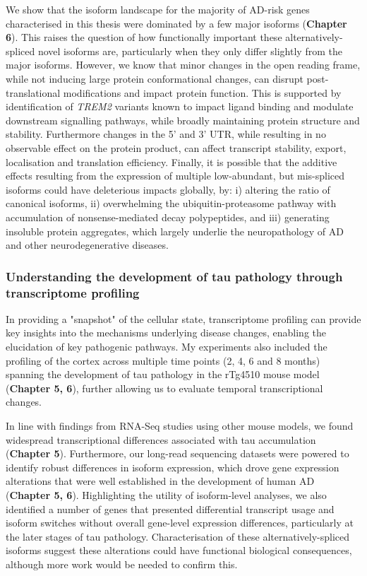 We show that the isoform landscape for the majority of AD-risk genes characterised in this thesis were dominated by a few major isoforms (\textbf{Chapter 6}). This raises the question of how functionally important these alternatively-spliced novel isoforms are, particularly when they only differ slightly from the major isoforms. However, we know that minor changes in the open reading frame, while not inducing large protein conformational changes, can disrupt post-translational modifications and impact protein function\cite{Reixachs-Sole2022}. This is supported by identification of \textit{TREM2} variants known to impact ligand binding and modulate downstream signalling pathways, while broadly maintaining protein structure and stability\cite{Kober2016}. Furthermore changes in the 5' and 3' UTR, while resulting in no observable effect on the protein product, can affect transcript stability, export, localisation and translation efficiency\cite{Reixachs-Sole2022}. Finally, it is possible that the additive effects resulting from the expression of multiple low-abundant, but mis-spliced isoforms could have deleterious impacts globally, by: i) altering the ratio of canonical isoforms, ii) overwhelming the ubiquitin-proteasome pathway with accumulation of nonsense-mediated decay polypeptides, and iii) generating insoluble protein aggregates, which largely underlie the neuropathology of AD and other neurodegenerative diseases\cite{Davis2018}.

\subsubsection{Understanding the development of tau pathology through transcriptome profiling}
\label{ch7: results_pathology}
In providing a "snapshot" of the cellular state, transcriptome profiling can provide key insights into the mechanisms underlying disease changes, enabling the elucidation of key pathogenic pathways. My experiments also included the profiling of the cortex across multiple time points (2, 4, 6 and 8 months) spanning the development of tau pathology in the rTg4510 mouse model (\textbf{Chapter 5, 6}), further allowing us to evaluate temporal transcriptional changes. 

In line with findings from RNA-Seq studies using other mouse models, we found widespread transcriptional differences associated with tau accumulation (\textbf{Chapter 5}). Furthermore, our long-read sequencing datasets were powered to identify robust differences in isoform expression, which drove gene expression alterations that were well established in the development of human AD (\textbf{Chapter 5, 6}). Highlighting the utility of isoform-level analyses, we also identified a number of genes that presented differential transcript usage and isoform switches without overall gene-level expression differences, particularly at the later stages of tau pathology. Characterisation of these alternatively-spliced isoforms suggest these alterations could have functional biological consequences, although more work would be needed to confirm this. 

